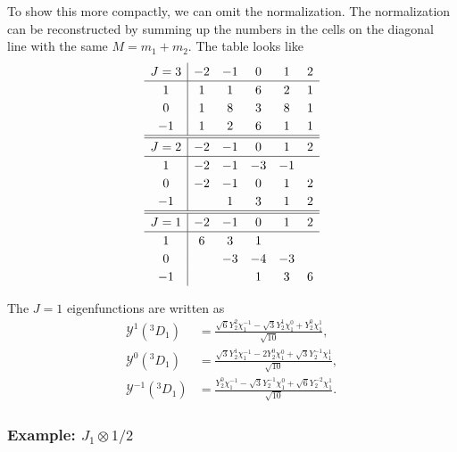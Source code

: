\documentclass[amsmath,amssymb,prc,aps]{revtex4-2}
\newcommand{\hmath}[1]{\texorpdfstring{$#1$}{#1}}
\begin{document}
To show this more compactly, we can omit the normalization.  The normalization
can be reconstructed by summing up the numbers in the cells on the diagonal
line with the same $M = m_1+m_2$.  The table looks like
\begin{align}
  \renewcommand{\arraystretch}{1.2}
  \begin{array}{c|ccccc}
  J=3 & -2 & -1 & 0 & 1 & 2 \\ \hline
   1  & 1 & 1 & 6 & 2 & 1 \\
   0  & 1 & 8 & 3 & 8 & 1 \\
  -1  & 1 & 2 & 6 & 1 & 1
  \\\hline\hline
  J=2 & -2 & -1 &  0 &  1 & 2 \\ \hline
   1  & -2 & -1 & -3 & -1 &  \\
   0  & -2 & -1 &  0 &  1 & 2 \\
  -1  &    &  1 &  3 &  1 & 2
  \\\hline\hline
  J=1 & -2 & -1 &  0 & 1  & 2 \\ \hline
   1  &  6 &  3 &  1 &    &  \\
   0  &    & -3 & -4 & -3 &  \\
  -1  &    &    &  1 &  3 & 6
  \end{array}
\end{align}

The $J=1$ eigenfunctions are written as
\begin{align}
  \mathcal{Y}^1(^3D_{1}) &= \frac{\sqrt{6} Y_2^2 \chi_1^{-1} - \sqrt{3}Y_2^1 \chi_1^0 + Y_2^0\chi_1^1}{\sqrt{10}}, \\
  \mathcal{Y}^0(^3D_{1}) &= \frac{\sqrt{3} Y_2^1 \chi_1^{-1} - 2 Y_2^0 \chi_1^0 + \sqrt{3} Y_2^{-1}\chi_1^1}{\sqrt{10}}, \\
  \mathcal{Y}^{-1}(^3D_{1}) &= \frac{Y_2^0 \chi_1^{-1} - \sqrt{3}Y_2^{-1} \chi_1^0 + \sqrt{6}Y_2^{-2}\chi_1^1}{\sqrt{10}}.
\end{align}

\subsubsection{Example: \hmath{J_1 \otimes{} 1/2}}
\end{document}
